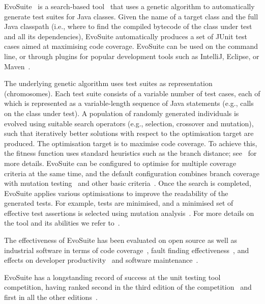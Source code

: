 \documentclass[sigconf,table]{acmart}
\newcommand{\EVOSUITE}{{\sc EvoSuite}\xspace}
\begin{document}
\EVOSUITE~\cite{FrA11c} is a search-based tool~\cite{GoA_TSE12} that
uses a genetic algorithm to automatically generate test suites for
Java classes. Given the name of a target class and the full Java
classpath (i.e., where to find the compiled bytecode of the class
under test and all its dependencies), \EVOSUITE automatically produces
a set of JUnit test cases aimed at maximising code coverage. \EVOSUITE
can be used on the command line, or through plugins for popular
development tools such as IntelliJ, Eclipse, or
Maven~\cite{ICST16_Tool}.

The underlying genetic algorithm uses test suites as representation
(chromosomes). Each test suite consists of a variable number of test
cases, each of which is represented as a variable-length sequence of
Java statements (e.g., calls on the class under test). A population of
randomly generated individuals is evolved using suitable search
operators (e.g., selection, crossover and mutation), such that
iteratively better solutions with respect to the optimisation target
are produced. The optimisation target is to maximise code coverage. To
achieve this, the fitness function uses standard heuristics such as
the branch distance; see~\cite{GoA_TSE12} for more details. \EVOSUITE
can be configured to optimise for multiple coverage criteria at the
same time, and the default configuration combines branch coverage with
mutation testing~\cite{emse14_mutation} and other basic
criteria~\cite{rojas2015combining}. Once the search is completed,
\EVOSUITE applies various optimisations to improve the readability of
the generated tests. For example, tests are minimised, and a
minimised set of effective test assertions is selected using mutation
analysis~\cite{10.1109/TSE.2011.93}. For more details on the tool and
its abilities we refer to~\cite{FrA11c,FrA13a}.


The effectiveness of \EVOSUITE has been evaluated on open source as
well as industrial software in terms of code
coverage~\cite{fraser2014large,emse_archive}, fault finding
effectiveness~\cite{shamshiri2015automatically,moein2017}, and effects
on developer
productivity~\cite{TOSEM_userstudy,ISSTA15_Study} and software
maintenance~\cite{ICST2018_Maintenance}.

\EVOSUITE has a longstanding record of success at the unit testing
tool competition, having ranked second in the third edition of the
competition~\cite{evosuiteAtSbst2015} and first in all the other
editions~\cite{evosuiteAtSbst2013,evosuiteAtFittest2013,evosuiteAtSbst2016,evosuiteAtSbst2017}.
\end{document}
